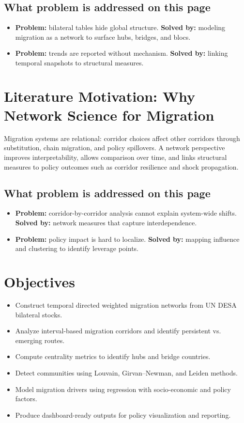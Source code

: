 \documentclass[12pt]{report}
\begin{document}
\section*{What problem is addressed on this page}
\begin{itemize}
  \item \textbf{Problem:} bilateral tables hide global structure. \textbf{Solved by:} modeling migration as a network to surface hubs, bridges, and blocs.
  \item \textbf{Problem:} trends are reported without mechanism. \textbf{Solved by:} linking temporal snapshots to structural measures.
\end{itemize}

\chapter{Literature Motivation: Why Network Science for Migration}
Migration systems are relational: corridor choices affect other corridors through substitution, chain migration, and policy spillovers. A network perspective improves interpretability, allows comparison over time, and links structural measures to policy outcomes such as corridor resilience and shock propagation.

\section*{What problem is addressed on this page}
\begin{itemize}
  \item \textbf{Problem:} corridor-by-corridor analysis cannot explain system-wide shifts. \textbf{Solved by:} network measures that capture interdependence.
  \item \textbf{Problem:} policy impact is hard to localize. \textbf{Solved by:} mapping influence and clustering to identify leverage points.
\end{itemize}

\chapter{Objectives}
\begin{itemize}
  \item Construct temporal directed weighted migration networks from UN DESA bilateral stocks.
  \item Analyze interval-based migration corridors and identify persistent vs. emerging routes.
  \item Compute centrality metrics to identify hubs and bridge countries.
  \item Detect communities using Louvain, Girvan--Newman, and Leiden methods.
  \item Model migration drivers using regression with socio-economic and policy factors.
  \item Produce dashboard-ready outputs for policy visualization and reporting.
\end{itemize}
\end{document}
